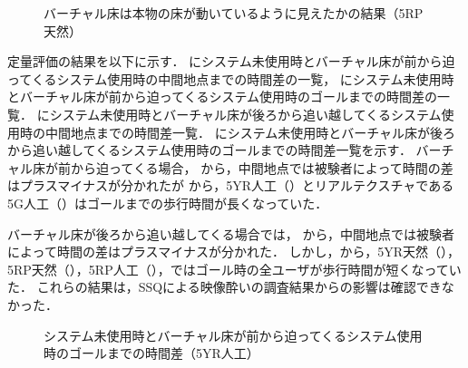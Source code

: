 \begin{figure}[H]
    \centering
    \caption{バーチャル床は本物の床が動いているように見えたかの結果（5RP天然）}
    \label{fig:c5RP}
\end{figure}

定量評価の結果を以下に示す．
にシステム未使用時とバーチャル床が前から迫ってくるシステム使用時の中間地点までの時間差の一覧，
にシステム未使用時とバーチャル床が前から迫ってくるシステム使用時のゴールまでの時間差の一覧．
にシステム未使用時とバーチャル床が後ろから追い越してくるシステム使用時の中間地点までの時間差一覧．
にシステム未使用時とバーチャル床が後ろから追い越してくるシステム使用時のゴールまでの時間差一覧を示す．
バーチャル床が前から迫ってくる場合，
から，中間地点では被験者によって時間の差はプラスマイナスが分かれたが
から，5YR人工（）とリアルテクスチャである5G人工（）はゴールまでの歩行時間が長くなっていた．

バーチャル床が後ろから追い越してくる場合では，
から，中間地点では被験者によって時間の差はプラスマイナスが分かれた．
しかし，から，5YR天然（），5RP天然（），5RP人工（），ではゴール時の全ユーザが歩行時間が短くなっていた．
これらの結果は，SSQによる映像酔いの調査結果からの影響は確認できなかった．
\begin{figure}[H]
    \centering
    \caption{システム未使用時とバーチャル床が前から迫ってくるシステム使用時のゴールまでの時間差（5YR人工）}
    \label{fig:5YRjinko}
\end{figure}


